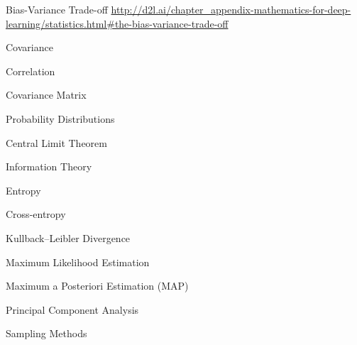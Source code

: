 \begin{frame}{Bias-Variance Trade-off}
\url{http://d2l.ai/chapter_appendix-mathematics-for-deep-learning/statistics.html#the-bias-variance-trade-off}
\end{frame}


\begin{frame}{Covariance}
\end{frame}

\begin{frame}{Correlation}
\end{frame}

\begin{frame}{Covariance Matrix}
\end{frame}

\begin{frame}{Probability Distributions}
\end{frame}

\begin{frame}{Central Limit Theorem}
\end{frame}

\begin{frame}{Information Theory}
\end{frame}

\begin{frame}{Entropy}
\end{frame}

\begin{frame}{Cross-entropy}
\end{frame}

\begin{frame}{Kullback–Leibler Divergence}
\end{frame}

\begin{frame}{Maximum Likelihood Estimation}
\end{frame}

\begin{frame}{Maximum a Posteriori Estimation (MAP)}
\end{frame}

\begin{frame}{Principal Component Analysis}
\end{frame}

\begin{frame}{Sampling Methods}
\end{frame}
